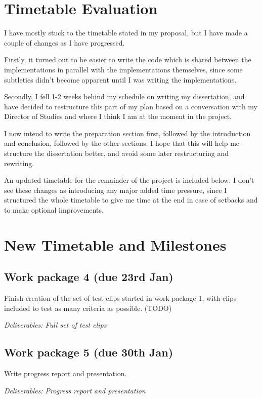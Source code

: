 \documentclass[12pt]{article}
\begin{document}
\section*{Timetable Evaluation}

I have mostly stuck to the timetable stated in my proposal, but I have made a couple of changes as I have progressed.

Firstly, it turned out to be easier to write the code which is shared between the implementations in parallel with the implementations themselves, since some subtleties didn't become apparent until I was writing the implementations. 

Secondly, I fell 1-2 weeks behind my schedule on writing my dissertation, and have decided to restructure this part of my plan based on a conversation with my Director of Studies and where I think I am at the moment in the project.

I now intend to write the preparation section first, followed by the introduction and conclusion, followed by the other sections. I hope that this will help me structure the dissertation better, and avoid some later restructuring and rewriting. 

An updated timetable for the remainder of the project is included below. I don't see these changes as introducing any major added time pressure, since I structured the whole timetable to give me time at the end in case of setbacks and to make optional improvements.


\section*{New Timetable and Milestones}


\subsection*{Work package 4 (due 23rd Jan)}
Finish creation of the set of test clips started in work package 1, with clips included to test as many criteria as possible. (TODO)

\emph{Deliverables: Full set of test clips}

\subsection*{Work package 5 (due 30th Jan)}
Write progress report and presentation.

\emph{Deliverables: Progress report and presentation}
\end{document}
